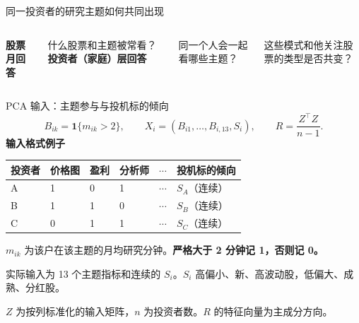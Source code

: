 \begin{frame}[label=pc-why]{同一投资者的研究主题如何共同出现}
  \begin{columns}[T,onlytextwidth]
    \textbf{股票月回答}\par\small
    什么股票和主题被常看？
    \textbf{投资者（家庭）层回答}\par\footnotesize
    同一个人会一起看哪些主题？\par
    这些模式和他关注股票的类型是否共变？
  \end{columns}
  \medskip
  \medskip
\end{frame}

\begin{frame}[t,label=pc-input]{PCA 输入：主题参与与投机标的倾向}
  \vspace{-1.1em}
  \setlength{\abovedisplayskip}{3pt}
  \setlength{\belowdisplayskip}{4pt}
  \[
    B_{ik}=\mathbf{1}\{m_{ik}>2\},
    \qquad X_i=(B_{i1},\ldots,B_{i,13},S_i),
    \qquad R=\frac{Z^\top Z}{n-1}.
  \]
  \small
  \setlength{\parskip}{1pt}
  \renewcommand{\arraystretch}{1.06}
  \textbf{输入格式例子}\par\smallskip
  \begin{tabularx}{\linewidth}{@{}l*{4}{Y}L{.21\linewidth}@{}}
    \toprule 投资者 & 价格图 & 盈利 & 分析师 & \(\cdots\) & 投机标的倾向\\\midrule
    A & 1 & 0 & 1 & \(\cdots\) & \(S_A\)（连续）\\
    B & 1 & 1 & 0 & \(\cdots\) & \(S_B\)（连续）\\
    C & 0 & 1 & 1 & \(\cdots\) & \(S_C\)（连续）\\\bottomrule
  \end{tabularx}\par\smallskip
  \(m_{ik}\) 为该户在该主题的月均研究分钟。\textbf{严格大于 2 分钟记 1，否则记 0。}\par
  实际输入为 13 个主题指标和连续的 \(S_i\)。\(S_i\) 高偏小、新、高波动股，低偏大、成熟、分红股。\par
  \(Z\) 为按列标准化的输入矩阵，\(n\) 为投资者数。\(R\) 的特征向量为主成分方向。
\end{frame}

